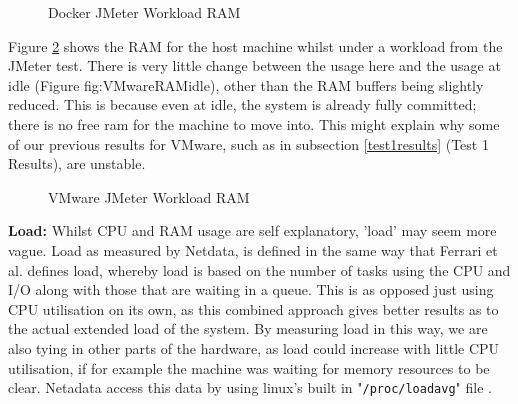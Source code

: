 \begin{figure}[H]
\caption{Docker JMeter Workload RAM}
\label{fig:DockerRAMwork}
\centering
\end{figure}

Figure \ref{fig:VMwareRAMwork} shows the RAM for the host machine whilst under a workload from the JMeter test. There is very little change between the usage here and the usage at idle (Figure {fig:VMwareRAMidle}), other than the RAM buffers being slightly reduced. This is because even at idle, the system is already fully committed; there is no free ram for the machine to move into. This might explain why some of our previous results for VMware, such as in subsection \ref{test1results} (Test 1 Results), are unstable.

\begin{figure}[H]
\caption{VMware JMeter Workload RAM}
\label{fig:VMwareRAMwork}
\centering
\end{figure}

\textbf{Load:}
Whilst CPU and RAM usage are self explanatory, 'load' may seem more vague. Load as measured by Netdata, is defined in the same way that Ferrari et al. defines load, whereby load is based on the number of tasks using the CPU and I/O along with those that are waiting in a queue\citep{loadferrari}. This is as opposed just using CPU utilisation on its own, as this combined approach gives better results as to the actual extended load of the system. By measuring load in this way, we are also tying in other parts of the hardware, as load could increase with little CPU utilisation, if for example the machine was waiting for memory resources to be clear. Netadata access this data by using linux's built in "\texttt{/proc/loadavg}" file \citep{systemload}.


